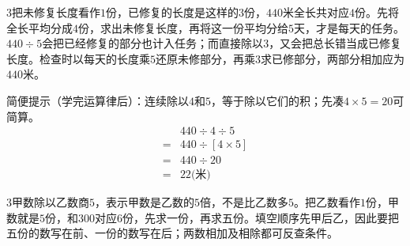 \documentclass[multi=snippet,border={5bp 20bp 5bp 5bp}]{standalone}
\newenvironment{snippet}[3]{\begin{minipage}{#1bp}\color{answerred}\fontsize{#2}{#3}\selectfont\raggedright}{\end{minipage}}
\begin{document}
\begin{snippet}{505}{11.5}{14}\begin{multicols}{3}\raggedcolumns 把未修复长度看作\(1\)\allowbreak 份，已修复的长度是这样的\(3\)\allowbreak 份，\(440\)\allowbreak 米全长共对应\(4\)\allowbreak 份。先将全长平均分成\(4\)\allowbreak 份，求出未修复长度，再将这一份平均分给\(5\)\allowbreak 天，才是每天的任务。\(440\div5\)\allowbreak 会把已经修复的部分也计入任务；而直接除以\(3\)\allowbreak ，又会把总长错当成已修复长度。检查时以每天的长度乘\(5\)\allowbreak 还原未修部分，再乘\(3\)\allowbreak 求已修部分，两部分相加应为\(440\)\allowbreak 米。\par 简便提示（学完运算律后）：连续除以\(4\)\allowbreak 和\(5\)\allowbreak ，等于除以它们的积；先凑\(4\times5=20\)\allowbreak 可简算。\[\begin{aligned}&440\div4\div5\\={}&440\div[4\times5]\\={}&440\div20\\={}&22\text{(米)}\end{aligned}\]\end{multicols}\end{snippet}
\begin{snippet}{505}{11.5}{14}\begin{multicols}{3}\raggedcolumns 甲数除以乙数商\(5\)\allowbreak ，表示甲数是乙数的\(5\)\allowbreak 倍，不是比乙数多\(5\)\allowbreak 。把乙数看作\(1\)\allowbreak 份，甲数就是\(5\)\allowbreak 份，和\(300\)\allowbreak 对应\(6\)\allowbreak 份，先求一份，再求五份。填空顺序先甲后乙，因此要把五份的数写在前、一份的数写在后；两数相加及相除都可反查条件。\end{multicols}\end{snippet}
\end{document}
